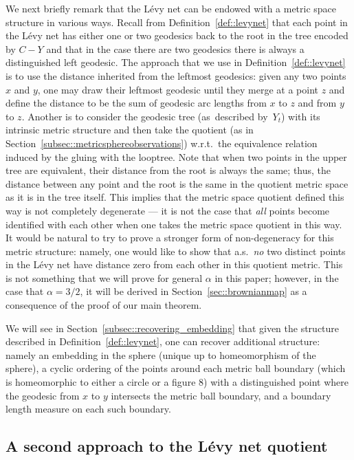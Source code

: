 \documentclass[JEP,XML,SOM,Unicode]{cedram}
\theoremstyle{plain}
\numberwithin{theorem}{section}
\theoremstyle{definition}
\begin{document}
We next briefly remark that the Lévy net can be endowed with a metric space structure in various ways. Recall from Definition~\ref{def::levynet} that each point in the Lévy net has either one or two geodesics back to the root in the tree encoded by $C-Y$ and that in the case there are two geodesics there is always a distinguished left geodesic. The approach that we use in Definition~\ref{def::levynet} is to use the distance inherited from the leftmost geodesics: given any two points $x$ and $y$, one may draw their leftmost geodesic until they merge at a point $z$ and define the distance to be the sum of geodesic arc lengths from $x$ to $z$ and from $y$ to $z$. Another is to consider the geodesic tree (as~described by~$Y_t$) with its intrinsic metric structure and then take the quotient (as in Section~\ref{subsec::metricsphereobservations}) w.r.t.\ the equivalence relation induced by the gluing with the looptree. Note that when two points in the upper tree are equivalent, their distance from the root is always the same; thus, the distance between any point and the root is the same in the quotient metric space as it is in the tree itself. This implies that the metric space quotient defined this way is not completely degenerate --- \ie it is not the case that \emph{all} points become identified with each other when one takes the metric space quotient in this way. It would be natural to try to prove a stronger form of non-degeneracy for this metric structure: namely, one would like to show that a.s.\ \emph{no} two distinct points in the Lévy net have distance zero from each other in this quotient metric. This is not something that we will prove for general $\alpha$ in this paper; however, in the case that $\alpha = 3/2$, it will be derived in Section~\ref{sec::brownianmap} as a consequence of the proof of our main theorem.

We will see in Section~\ref{subsec::recovering_embedding} that given the structure described in Definition~\ref{def::levynet}, one can recover additional structure: namely an embedding in the sphere (unique up to homeomorphism of the sphere), a cyclic ordering of the points around each metric ball boundary (which is homeomorphic to either a circle or a figure $8$) with a distinguished point where the geodesic from $x$ to $y$ intersects the metric ball boundary, and a boundary length measure on each such boundary.

\subsection{A second approach to the Lévy net quotient}
\label{subsec::levynet_second_construction}
\end{document}

